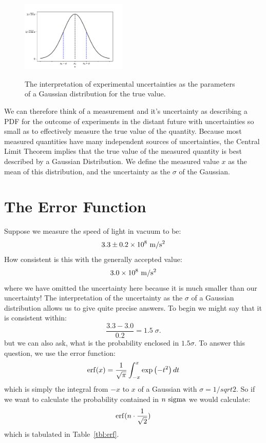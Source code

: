 \documentclass[12pt,oneside]{book}
\begin{document}
\begin{figure}[htbp]
\begin{center}
{\includegraphics[width=0.45\textwidth]{figs/stdunc.pdf}}
\end{center}
\caption{\label{fig:stdunc}  The interpretation of experimental uncertainties as the parameters of a Gaussian distribution for the true value.}
\end{figure}

We can therefore think of a measurement and it's uncertainty as describing a PDF for the outcome of  experiments in the distant future with uncertainties so small as to effectively measure the true value of the quantity.  Because most measured quantities have many independent sources of uncertainties, the Central Limit Theorem implies that the true value of the measured quantity is best described by a Gaussian  Distribution.  We define the measured value $x$ as the mean of this distribution, and the uncertainty as the $\sigma$ of the Gaussian.

\section{The Error Function}

Suppose we measure the speed of light in vacuum to be:
\begin{displaymath}
3.3 \pm 0.2 \times 10^8~{\rm m}/{\rm s}^2
\end{displaymath}
How consistent is this with the generally accepted value:
\begin{displaymath}
3.0 \times 10^8~{\rm m}/{\rm s}^2
\end{displaymath}
where we have omitted the uncertainty here because it is much smaller than our uncertainty!   The interpretation of the uncertainty as the $\sigma$ of a Gaussian distribution allows us to give quite precise answers.  To begin we might say that it is consistent within:
\begin{displaymath}
\frac{3.3 - 3.0}{0.2} = 1.5 \; \sigma.
\end{displaymath}
but we can also ask, what is the probability enclosed in $1.5 \sigma$.  To  answer this question, we use the error function:
\begin{displaymath}
{\rm erf}(x) = \frac{1}{\sqrt{\pi}} \int^x_{-x} \exp\left(-t^2 \right) dt
\end{displaymath}
which is simply the integral from $-x$ to $x$ of a Gaussian with $\sigma = 1/sqrt{2}$.  So if we want to calculate the probability contained in $n~\rm sigma$ we would calculate:
\begin{displaymath}
 {\rm erf}(n \cdot \frac{1}{\sqrt{2}})
\end{displaymath}
which is tabulated in Table~\ref{tbl:erf}.\\
\end{document}
